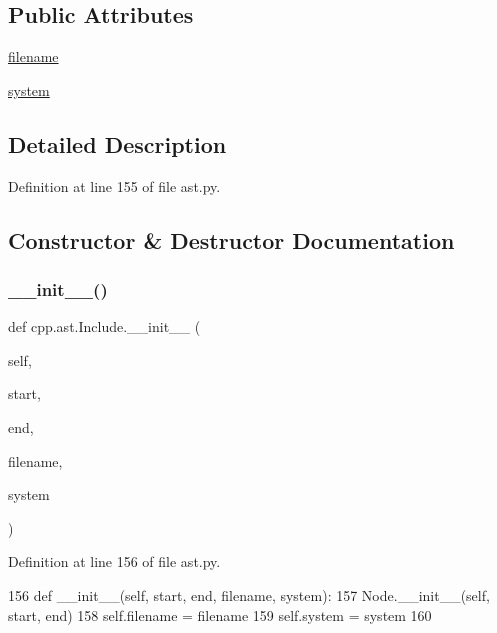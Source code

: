 \subsection*{Public Attributes}
\begin{DoxyCompactItemize}
\item 
\hyperlink{classcpp_1_1ast_1_1Include_a9ecff64f127655d3c17e9abe4ebe3852}{filename}
\item 
\hyperlink{classcpp_1_1ast_1_1Include_a2e8e535b1af7d9b0ff94d0ae9f86e5c5}{system}
\end{DoxyCompactItemize}


\subsection{Detailed Description}


Definition at line 155 of file ast.\+py.



\subsection{Constructor \& Destructor Documentation}
\mbox{\label{classcpp_1_1ast_1_1Include_a41b000a9f16a9a1840e56a761bb7045c}} 
\subsubsection{\texorpdfstring{\+\_\+\+\_\+init\+\_\+\+\_\+()}{\_\_init\_\_()}}
{\footnotesize\ttfamily def cpp.\+ast.\+Include.\+\_\+\+\_\+init\+\_\+\+\_\+ (\begin{DoxyParamCaption}\item[{}]{self,  }\item[{}]{start,  }\item[{}]{end,  }\item[{}]{filename,  }\item[{}]{system }\end{DoxyParamCaption})}



Definition at line 156 of file ast.\+py.


\begin{DoxyCode}
156     \textcolor{keyword}{def }\_\_init\_\_(self, start, end, filename, system):
157         Node.\_\_init\_\_(self, start, end)
158         self.filename = filename
159         self.system = system
160 
\end{DoxyCode}



